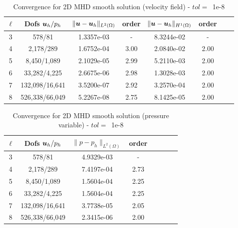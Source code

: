 \begin{table}[h!]
\begin{center}
\begin{tabular}{cccccccc}
\hline
$\ell$ &    Dofs $\boldsymbol u_h/p_h$ & $\|\boldsymbol u-\boldsymbol u_h\|_{L^2(\Omega)}$ & order & $\|\boldsymbol u-\boldsymbol u_h\|_{H^1(\Omega)}$ & order  \\
\hline
3 &     578/81 &  1.3357e-03 &     - &  8.3244e-02 &     -  \\
4 &    2,178/289 &  1.6752e-04 &     3.00 &  2.0840e-02 &     2.00  \\
5 &    8,450/1,089 &  2.1029e-05 &     2.99 &  5.2110e-03 &     2.00  \\
6 &   33,282/4,225 &  2.6675e-06 &     2.98 &  1.3028e-03 &     2.00  \\
7 &  132,098/16,641 &  3.5200e-07 &     2.92 &  3.2570e-04 &     2.00  \\
8 &  526,338/66,049 &  5.2267e-08 &     2.75 &  8.1425e-05 &     2.00  \\

\hline
\end{tabular}
\caption{Convergence for 2D MHD smooth solution (velocity field) - $tol=$~1e-8}
\label{tab:MHD_2D_smooth_fluids_velocity}
\end{center}
\end{table}
\begin{table}[h!]
\begin{center}
\begin{tabular}{cccccccc}
\hline
$\ell$ &    Dofs $\boldsymbol u_h/p_h$ &        $\|{p}-{p}_h\|_{L^2(\Omega)}$ & order \\
\hline

 3 &     578/81 &  4.9329e-03 &      - \\
 4 &    2,178/289 & 7.4197e-04 &      2.73\\
 5 &    8,450/1,089 & 1.5604e-04 &      2.25 \\
 6 &   33,282/4,225 &   1.5604e-04 &      2.25 \\
 7 &  132,098/16,641 &  3.7738e-05 &      2.05  \\
 8 &  526,338/66,049 &  2.3415e-06 &      2.00 \\
\hline
\end{tabular}
\caption{Convergence for 2D MHD smooth solution  (pressure variable) - $tol=$~1e-8}
\label{tab:MHD_2D_smooth_fluids_pressure}
\end{center}
\end{table}


